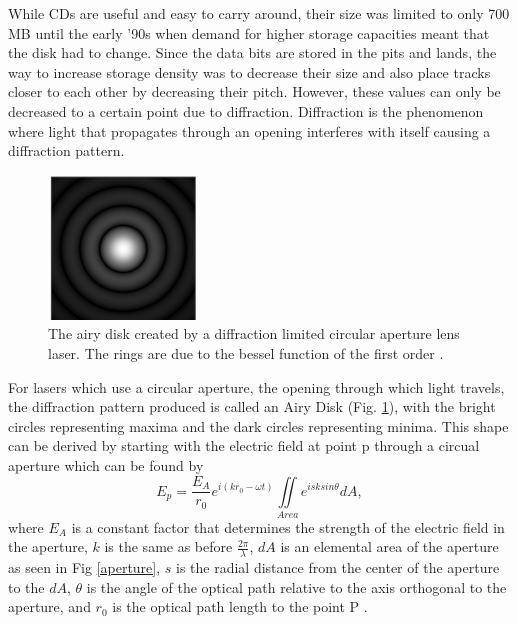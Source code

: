 \documentclass[ notitlepage, numerical, 11pt]{revtex4-1} %
\begin{document}
While CDs are useful and easy to carry around, their size was limited to only 700 MB until the early '90s when demand for higher storage capacities meant that the disk had to change. Since the data bits are stored in the pits and lands, the way to increase storage density was to decrease their size and also place tracks closer to each other by decreasing their pitch. However, these values can only be decreased to a certain point due to diffraction. Diffraction is the phenomenon where light that propagates through an opening interferes with itself causing a diffraction pattern.
\begin{figure}[H]
\centerline{\includegraphics[scale=1.5]{220px-Airy-pattern.jpg}}
\caption{The airy disk created by a diffraction limited circular aperture lens laser. The rings are due to the bessel function of the first order \cite{airyDisk, optics}.}
\label{airy}
\end{figure} 
For lasers which use a circular aperture, the opening through which light travels, the diffraction pattern produced is called an Airy Disk (Fig. \ref{airy}), with the bright circles representing maxima and the dark circles representing minima.
This shape can be derived by starting with the electric field at point p through a circual aperture which can be found by 
\begin{equation}
E_p = \frac{E_A}{r_0}e^{i(k r_0 -\omega t)}\iint \limits_{Area} e^{i s k sin\theta} dA,
\label{EP}
\end{equation}
where $E_A$ is a constant factor that determines the strength of the electric field in the aperture, $k$ is the same as before $\frac{2\pi}{\lambda}$, $dA$ is an elemental area of the aperture as seen in Fig \ref{aperture}, $s$ is the radial distance from the center of the aperture to the $dA$, $\theta$ is the angle of the optical path relative to the axis orthogonal to the aperture, and $r_0$ is the optical path length to the point P \cite{optics}. 
\end{document}

